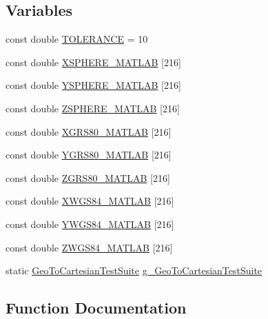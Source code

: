 \subsection*{Variables}
\begin{DoxyCompactItemize}
\item 
const double \hyperlink{geo-to-cartesian-test_8cc_a89311a98397f9d6967d2cb10d5152d77}{T\+O\+L\+E\+R\+A\+N\+CE} = 10
\item 
const double \hyperlink{geo-to-cartesian-test_8cc_aa5e69989c0e923f1c732094071ddff95}{X\+S\+P\+H\+E\+R\+E\+\_\+\+M\+A\+T\+L\+AB} \mbox{[}216\mbox{]}
\item 
const double \hyperlink{geo-to-cartesian-test_8cc_a9d86d14dc9fe56ade53f8b891bc292eb}{Y\+S\+P\+H\+E\+R\+E\+\_\+\+M\+A\+T\+L\+AB} \mbox{[}216\mbox{]}
\item 
const double \hyperlink{geo-to-cartesian-test_8cc_a4346834cba6d329a54d146eaea16624c}{Z\+S\+P\+H\+E\+R\+E\+\_\+\+M\+A\+T\+L\+AB} \mbox{[}216\mbox{]}
\item 
const double \hyperlink{geo-to-cartesian-test_8cc_af4c611b6a4fe5e678457f7d0cc865814}{X\+G\+R\+S80\+\_\+\+M\+A\+T\+L\+AB} \mbox{[}216\mbox{]}
\item 
const double \hyperlink{geo-to-cartesian-test_8cc_a91670b344c6133c351d1e527135e211a}{Y\+G\+R\+S80\+\_\+\+M\+A\+T\+L\+AB} \mbox{[}216\mbox{]}
\item 
const double \hyperlink{geo-to-cartesian-test_8cc_ad1faf7a77160fbf52b205680087c4be7}{Z\+G\+R\+S80\+\_\+\+M\+A\+T\+L\+AB} \mbox{[}216\mbox{]}
\item 
const double \hyperlink{geo-to-cartesian-test_8cc_ac2624a2244b967a69c38a75fe9d48bde}{X\+W\+G\+S84\+\_\+\+M\+A\+T\+L\+AB} \mbox{[}216\mbox{]}
\item 
const double \hyperlink{geo-to-cartesian-test_8cc_a978d0276d8364f2827ad016eb05cc5d6}{Y\+W\+G\+S84\+\_\+\+M\+A\+T\+L\+AB} \mbox{[}216\mbox{]}
\item 
const double \hyperlink{geo-to-cartesian-test_8cc_a9d45ff67eb57ac53374a8edaadd0aaad}{Z\+W\+G\+S84\+\_\+\+M\+A\+T\+L\+AB} \mbox{[}216\mbox{]}
\item 
static \hyperlink{classGeoToCartesianTestSuite}{Geo\+To\+Cartesian\+Test\+Suite} \hyperlink{geo-to-cartesian-test_8cc_aac42026bce097b0b9417385ab8e0869b}{g\+\_\+\+Geo\+To\+Cartesian\+Test\+Suite}
\end{DoxyCompactItemize}


\subsection{Function Documentation}
